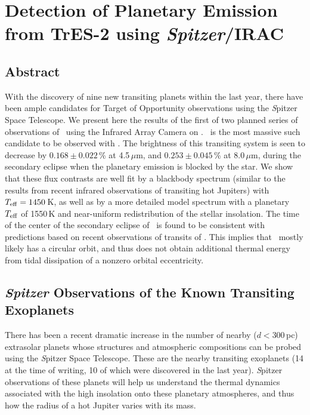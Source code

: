 \chapter[Detection of Planetary Emission from TrES-2 using \emph{Spitzer}/ IRAC]
{%
Detection of Planetary Emission from TrES-2 using \emph{Spitzer}/IRAC%
\protect\CFNE%
}\label{cha:spitzer}

\section*{Abstract}\label{cha:spitzer:sec:abs}

With the discovery of nine new transiting planets within the last year, there have been ample candidates for Target of Opportunity observations using the {\textit Spitzer Space Telescope}.
We present here the results of the first of two planned series of observations of \tresTwo\ using the Infrared Array Camera on \spi.
\tresTwo\ is the most massive such candidate to be observed with \spi.
The brightness of this transiting system is seen to decrease by \mbox{$0.168 \pm 0.022$\,\%} at 4.5\,$\mu$m, and \mbox{$0.253 \pm 0.045$\,\%} at 8.0\,$\mu$m, during the secondary eclipse when the planetary emission is blocked by the star.
We show that these flux contrasts are well fit by a blackbody spectrum (similar to the results from recent infrared observations of transiting hot Jupiters) with \mbox{$T_{\rm eff}=1450$\,K}, as well as by a more detailed model spectrum with a planetary $T_{\rm eff}$ of 1550\,K and near-uniform redistribution of the stellar insolation.
The time of the center of the secondary eclipse of \tresTwo\ is found to be consistent with predictions based on recent observations of transits of \tresTwo.
This implies that \tresTwo\ mostly likely has a circular orbit, and thus does not obtain additional thermal energy from tidal dissipation of a nonzero orbital eccentricity.

\section[\textit{Spitzer} Observations of the Known Transiting Exoplanets]{\textbf{\textit{Spitzer}} Observations of the Known Transiting Exoplanets}\label{cha:spitzer:sec:intro}

There has been a recent dramatic increase in the number of nearby ($d<300$\,pc) extrasolar planets whose structures and atmospheric compositions can be probed using the {\textit Spitzer Space Telescope}.
These are the nearby transiting exoplanets (14 at the time of writing, 10 of which were discovered in the last year).
{\textit Spitzer} observations of these planets will help us understand the thermal dynamics associated with the high insolation onto these planetary atmospheres, and thus how the radius of a hot Jupiter varies with its mass.


